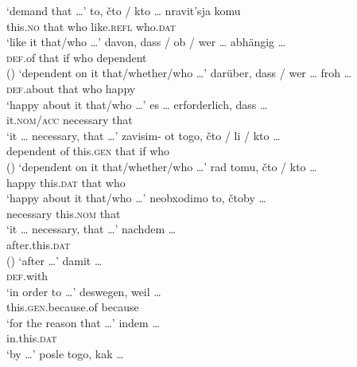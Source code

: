 \documentclass[output=paper]{langscibook}
\begin{document}
    \glt `demand that {\dots}'
    \ex \gll to, čto / kto {\dots} nravit'sja komu \\
    this.\textsc{no} that {} who {} like.\textsc{refl} who.\textsc{dat} \\
    \glt `like it that/who {\dots}'
\z\ex\label{ex:zimmermann:4.1}
    \ea \gll davon, dass / ob / wer {\dots} abhängig {\dots} \\
    \textsc{def}.of that {} if {} who {} dependent {} \\  \hfill ()
    \glt `dependent on it that/whether/who {\dots}'\largerpage
    \ex \gll darüber, dass / wer {\dots} froh {\dots} \\
    \textsc{def}.about that {} who {} happy {} \\
    \glt `happy about it that/who {\dots}'
    \ex \gll es {\dots} erforderlich, dass {\dots} \\
    it.\textsc{nom/acc} {} necessary that {} \\
    \glt `it {\dots} necessary, that {\dots}'
\z\ex\label{ex:zimmermann:4.2}
    \ea \gll zavisim- ot togo, čto / li / kto {\dots} \\
    dependent of this.\textsc{gen} that {} if {} who {} \\ \hfill ()
    \glt `dependent on it that/whether/who {\dots}'
    \ex \gll rad tomu, čto / kto {\dots} \\
    happy this.\textsc{dat} that {} who {} \\
    \glt `happy about it that/who {\dots}'
    \ex \gll neobxodimo to, čtoby {\dots} \\
    necessary this.\textsc{nom} that {} \\
    \glt `it {\dots} necessary, that {\dots}'
\z\ex\label{ex:zimmermann:5.1}
    \ea \gll nachdem {\dots} \\
    after.this.\textsc{dat} {} \\ \hfill ()
    \glt `after {\dots}'
    \ex \gll damit {\dots} \\
    \textsc{def}.with {} \\
    \glt `in order to {\dots}'
    \ex \gll deswegen, weil {\dots} \\
    this.\textsc{gen}.because.of because {} \\
    \glt `for the reason that {\dots}'
    \ex indem {\dots} \\
    in.this.\textsc{dat} {} \\
    \glt `by {\dots}'
\z\ex\label{ex:zimmermann:5.2}
    \ea \gll posle togo, kak {\dots} \\
\end{document}
